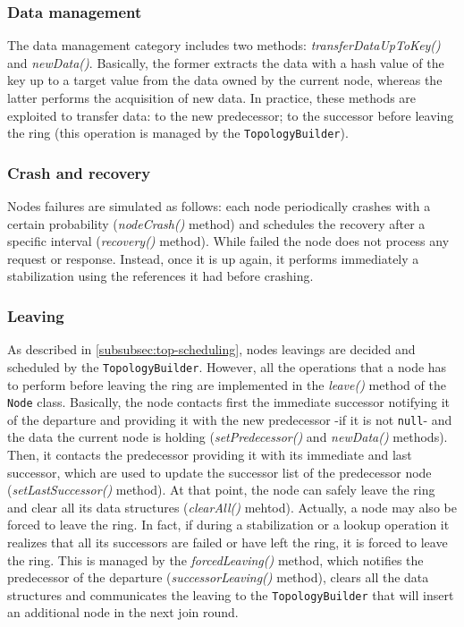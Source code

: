 \documentclass[11pt,twocolumn,letterpaper]{article}
\begin{document}
	\subsubsection{Data management}
	\label{subsubsec:data-management}
	The data management category includes two methods: \textit{transferDataUpToKey()} and \textit{newData()}. \newline
	Basically, the former extracts the data with a hash value of the key up to a target value from the data owned by the current node, whereas the latter performs the acquisition of new data. In practice, these methods are exploited to transfer data: to the new predecessor; to the successor before leaving the ring (this operation is managed by the \texttt{TopologyBuilder}). 
	
	\subsubsection{Crash and recovery}
	\label{subsubsec:crash-n-recovery}
	Nodes failures are simulated as follows: each node periodically crashes with a certain probability (\textit{nodeCrash()} method) and schedules the recovery after a specific interval (\textit{recovery()} method). While failed the node does not process any request or response. Instead, once it is up again, it performs immediately a stabilization using the references it had before crashing.
	
	\subsubsection{Leaving}
	\label{subsubsec:leaving}
	As described in \cref{subsubsec:top-scheduling}, nodes leavings are decided and scheduled by the \texttt{TopologyBuilder}. However, all the operations that a node has to perform before leaving the ring are implemented in the \textit{leave()} method
	of the \texttt{Node} class. \newline
	Basically, the node contacts first the immediate successor notifying it of the departure and providing it with the new predecessor -if it is not \texttt{null}- and the data the current node is holding (\textit{setPredecessor()} and \textit{newData()} methods). Then, it contacts the predecessor providing it with its immediate and last successor, which are used to update the successor list of the predecessor node (\textit{setLastSuccessor()} method). At that point, the node can safely leave the ring and clear all its data structures (\textit{clearAll()} mehtod). \newline
	Actually, a node may also be forced to leave the ring. In fact, if during a stabilization or a lookup operation it realizes that all its successors are failed or have left the ring, it is forced to leave the ring. This is managed by the \textit{forcedLeaving()} method, which notifies the predecessor of the departure (\textit{successorLeaving()} method), clears all the data structures and communicates the leaving to the \texttt{TopologyBuilder} that will insert an additional node in the next join round.
	
\end{document}
